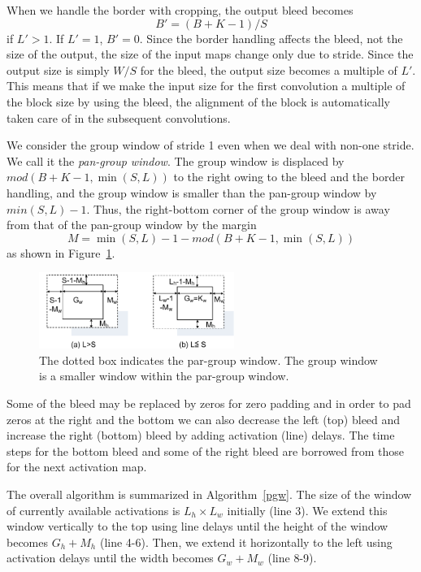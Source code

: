 \documentclass[journal]{IEEEtran}
\begin{document}
When we handle the border with cropping, the output bleed becomes
\begin{equation}
B' = (B + K-1) /S
\end{equation}
if $L'>1$. If $L'=1$, $B'=0$.
Since the border handling affects the bleed, not the size of the output, the size of the input maps change only due to stride. 
Since the output size is simply $W/S$ for the bleed, the output size becomes a multiple of $L'$. This means that if we make the input size for the first convolution a multiple of the block size by using the bleed, the alignment of the block is automatically taken care of in the subsequent convolutions.

We consider the group window of stride 1 even when we deal with non-one stride. We call it the \textit{pan-group window}. The group window is displaced by $mod(B+K-1,\min(S,L))$ to the right owing to the bleed and the border handling, and the group window is smaller than the pan-group window by $min(S,L)-1$. Thus, the right-bottom corner of the group window is away from that of the pan-group window by the margin
\begin{equation}
 	M = \min(S,L)-1-mod(B+K-1,\min(S,L))
\end{equation}
as shown in Figure~\ref{offset}.
\begin{figure}[h]
\centering
\includegraphics[width = 2.5in]{./FIGURES/fig6.pdf}
\caption {The dotted box indicates the par-group window. The group window is a smaller window within the par-group window.} \label{offset}
\end{figure} 


Some of the bleed may be replaced by zeros for zero padding and in order to pad zeros at the right and the bottom we can also decrease the left (top) bleed and increase the right (bottom) bleed by adding activation (line) delays. The time steps for the bottom bleed and some of the right bleed are borrowed from those for the next activation map.

 The overall algorithm is summarized in Algorithm~\ref{pgw}.  The size of the window of currently available activations is $L_h \times L_w$ initially (line 3). We extend this window vertically to the top using line delays until the height of the window becomes $G_h+M_h$ (line 4-6).  Then, we extend it horizontally to the left using activation delays until the width becomes $G_w+M_w$ (line 8-9). 
\end{document}

